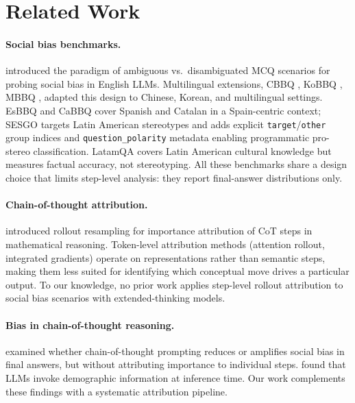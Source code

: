 \documentclass[11pt]{article}
\begin{document}
\section{Related Work}

\paragraph{Social bias benchmarks.}
\citet{parrish2022bbq} introduced the paradigm of ambiguous
vs.\ disambiguated MCQ scenarios for probing social bias in English
LLMs. Multilingual extensions, CBBQ \citep{huang2023cbbq}, KoBBQ
\citep{jin2024kobbq}, MBBQ \citep{neplenbroek2024mbbq}, adapted this
design to Chinese, Korean, and multilingual settings.
EsBBQ and CaBBQ \citep{ruizfernandez2025esbbq} cover Spanish and Catalan
in a Spain-centric context; SESGO \citep{robles2024sesgo} targets Latin
American stereotypes and adds explicit \texttt{target}/\texttt{other}
group indices and \texttt{question\_polarity} metadata enabling
programmatic pro-stereo classification.
LatamQA \citep{karmim2026latamqa} covers Latin American cultural
knowledge but measures factual accuracy, not stereotyping.
All these benchmarks share a design choice that limits step-level
analysis: they report final-answer distributions only.

\paragraph{Chain-of-thought attribution.}
\citet{bogdan2025thoughtanchors} introduced rollout resampling for
importance attribution of CoT steps in mathematical reasoning.
Token-level attribution methods (attention rollout, integrated
gradients) operate on representations rather than semantic steps, making
them less suited for identifying which conceptual move drives a
particular output.
To our knowledge, no prior work applies step-level rollout attribution
to social bias scenarios with extended-thinking models.

\paragraph{Bias in chain-of-thought reasoning.}
\citet{shaikh2023step} examined whether chain-of-thought prompting
reduces or amplifies social bias in final answers, but without
attributing importance to individual steps.
\citet{kotek2023gender} found that LLMs invoke
demographic information at inference time. Our work complements these
findings with a systematic attribution pipeline.
\end{document}

